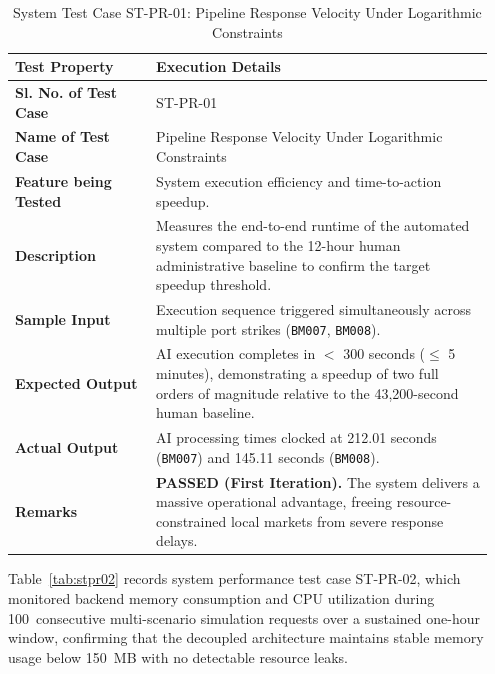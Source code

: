 \begin{table}[H]
    \centering
    \caption{System Test Case ST-PR-01: Pipeline Response Velocity Under Logarithmic Constraints}
    \label{tab:stpr01}
    \begin{tabular}{|p{0.28\linewidth}|p{0.67\linewidth}|}
        \hline
        \textbf{Test Property} & \textbf{Execution Details} \\ \hline
        \textbf{Sl. No. of Test Case} & ST-PR-01 \\ \hline
        \textbf{Name of Test Case} & Pipeline Response Velocity Under Logarithmic Constraints \\ \hline
        \textbf{Feature being Tested} & System execution efficiency and time-to-action speedup. \\ \hline
        \textbf{Description} & Measures the end-to-end runtime of the automated system compared to the 12-hour human administrative baseline to confirm the target speedup threshold. \\ \hline
        \textbf{Sample Input} & Execution sequence triggered simultaneously across multiple port strikes (\texttt{BM007}, \texttt{BM008}). \\ \hline
        \textbf{Expected Output} & AI execution completes in $<$ 300 seconds ($\le$ 5 minutes), demonstrating a speedup of two full orders of magnitude relative to the 43,200-second human baseline. \\ \hline
        \textbf{Actual Output} & AI processing times clocked at 212.01 seconds (\texttt{BM007}) and 145.11 seconds (\texttt{BM008}). \\ \hline
        \textbf{Remarks} & \textbf{PASSED (First Iteration).} The system delivers a massive operational advantage, freeing resource-constrained local markets from severe response delays. \\ \hline
    \end{tabular}
\end{table}

Table~\ref{tab:stpr02} records system performance test case ST-PR-02, which monitored backend memory consumption and CPU utilization during 100~consecutive multi-scenario simulation requests over a sustained one-hour window, confirming that the decoupled architecture maintains stable memory usage below 150~MB with no detectable resource leaks.

